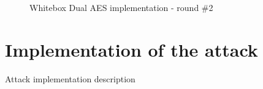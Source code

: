 \documentclass[11pt,oneside,final]{fithesis2}
\begin{document}
		\begin{figure}
		\begin{center}
		\leavevmode
		\centerline{}
		\end{center}
		\caption{Whitebox Dual AES implementation - round \#2}
		\label{fig:wbaesdual}
		\end{figure}

    \section{Implementation of the attack}
    Attack implementation description
\end{document}

